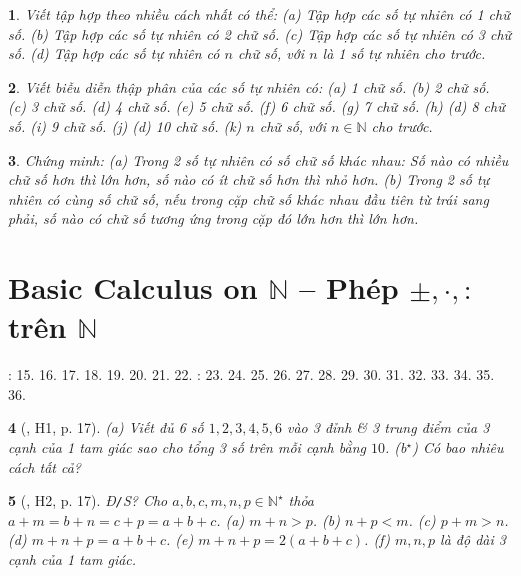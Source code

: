 \documentclass{article}
\newtheorem{baitoan}{}
\begin{document}
\begin{baitoan}
	Viết tập hợp theo nhiều cách nhất có thể: (a) Tập hợp các số tự nhiên có 1 chữ số. (b) Tập hợp các số tự nhiên có 2 chữ số. (c) Tập hợp các số tự nhiên có 3 chữ số. (d) Tập hợp các số tự nhiên có $n$ chữ số, với $n$ là 1 số tự nhiên cho trước.
\end{baitoan}

\begin{baitoan}
	Viết biễu diễn thập phân của các số tự nhiên có: (a) 1 chữ số. (b) 2 chữ số. (c) 3 chữ số. (d) 4 chữ số. (e) 5 chữ số. (f) 6 chữ số. (g) 7 chữ số. (h) (d) 8 chữ số. (i) 9 chữ số. (j) (d) 10 chữ số. (k) $n$ chữ số, với $n\in\mathbb{N}$ cho trước. 
\end{baitoan}

\begin{baitoan}
	Chứng minh: (a) Trong 2 số tự nhiên có số chữ số khác nhau: Số nào có nhiều chữ số hơn thì lớn hơn, số nào có ít chữ số hơn thì nhỏ hơn. (b) Trong 2 số tự nhiên có cùng số chữ số, nếu trong cặp chữ số khác nhau đầu tiên từ trái sang phải, số nào có chữ số tương ứng trong cặp đó lớn hơn thì lớn hơn.
\end{baitoan}


\section{Basic Calculus on $\mathbb{N}$ -- Phép $\pm,\cdot,:$ trên $\mathbb{N}$}
\cite[\S3, pp. 10--12]{SBT_Toan_6_Canh_Dieu_tap_1}: 15. 16. 17. 18. 19. 20. 21. 22. \cite[\S4, pp. 13--15]{SBT_Toan_6_Canh_Dieu_tap_1}: 23. 24. 25. 26. 27. 28. 29. 30. 31. 32. 33. 34. 35. 36.

\begin{baitoan}[\cite{Binh_boi_duong_Toan_6_tap_1}, H1, p. 17]
	(a) Viết đủ 6 số $1,2,3,4,5,6$ vào 3 đỉnh \& 3 trung điểm của 3 cạnh của 1 tam giác sao cho tổng 3 số trên mỗi cạnh bằng $10$. (b${}^\star$) Có bao nhiêu cách tất cả?
\end{baitoan}

\begin{baitoan}[\cite{Binh_boi_duong_Toan_6_tap_1}, H2, p. 17]
	{\rm Đ{\tt/}S?} Cho $a,b,c,m,n,p\in\mathbb{N}^\star$ thỏa $a + m = b + n = c + p = a + b + c$. (a) $m + n > p$. (b) $n + p < m$. (c) $p + m > n$. (d) $m + n + p = a + b + c$. (e) $m + n + p = 2(a + b + c)$. (f) $m,n,p$ là độ dài 3 cạnh của 1 tam giác.
\end{baitoan}
\end{document}
